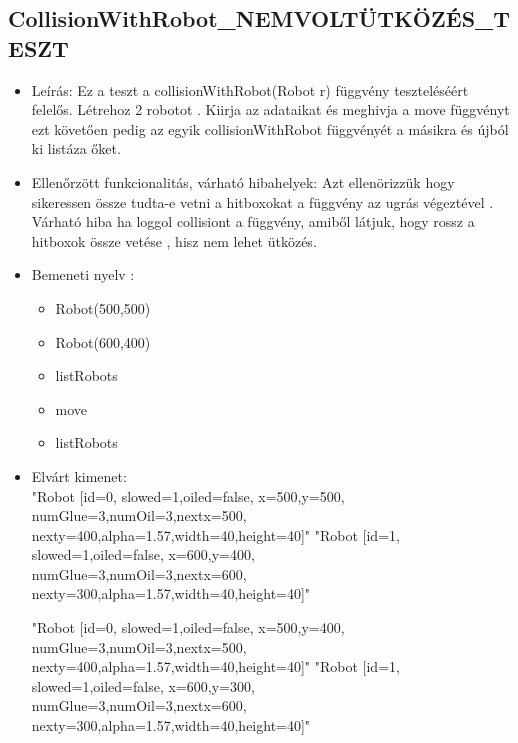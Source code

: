 \subsection{CollisionWithRobot\_NEMVOLTÜTKÖZÉS\_TESZT}
\begin{itemize}
	\item Leírás: Ez a teszt a collisionWithRobot(Robot r) függvény teszteléséért felelős.
			Létrehoz 2 robotot  .
			Kiirja az adataikat  és meghivja a move függvényt ezt követően pedig az egyik collisionWithRobot függvényét a másikra 
			és újból ki listáza őket.			\newline
	\item Ellenőrzött funkcionalitás, várható hibahelyek: Azt ellenörizzük hogy sikeressen össze tudta-e vetni a hitboxokat a függvény az ugrás végeztével .
	Várható hiba ha loggol collisiont a függvény, amiből látjuk, hogy rossz a hitboxok össze vetése , hisz nem lehet ütközés. 

	
	\item Bemeneti nyelv :
		\begin{itemize}
		\item Robot(500,500)
		\item Robot(600,400)
		\item listRobots
		\item move
		\item listRobots
		\end{itemize}
	

	\item Elvárt kimenet: \\
		"Robot [id=0,  slowed=1,oiled=false, x=500,y=500, 
		\\numGlue=3,numOil=3,nextx=500,
		\\nexty=400,alpha=1.57,width=40,height=40]"\newline
		"Robot [id=1,  slowed=1,oiled=false, x=600,y=400, 
		\\numGlue=3,numOil=3,nextx=600,
		\\nexty=300,alpha=1.57,width=40,height=40]"
		
		
	
		
		 "Robot [id=0,  slowed=1,oiled=false, x=500,y=400, 
		\\numGlue=3,numOil=3,nextx=500,
		\\nexty=400,alpha=1.57,width=40,height=40]"\newline
		"Robot [id=1,  slowed=1,oiled=false, x=600,y=300, 
		\\numGlue=3,numOil=3,nextx=600,
		\\nexty=300,alpha=1.57,width=40,height=40]"\newline
		
\end{itemize}

